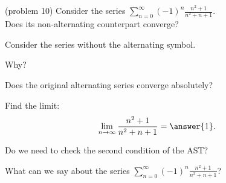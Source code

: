\documentclass{ximera}
\begin{document}
\begin{problem}(problem 10)
Consider the series $\displaystyle{\sum_{n=0}^\infty (-1)^n \frac{n^2 + 1}{n^2 + n + 1}}$.\\
Does its non-alternating counterpart converge?
\begin{hint} 
Consider the series without the alternating symbol.
\end{hint}
\begin{multipleChoice}
\end{multipleChoice}

Why?
\begin{multipleChoice}
\end{multipleChoice}




Does the original alternating series converge absolutely?
\begin{multipleChoice}
\end{multipleChoice}



Find the limit:
\[
\lim_{n\to\infty} \frac{n^2 + 1}{n^2 + n + 1} = \answer{1}.
\]

Do we need to check the second condition of the AST?
\begin{multipleChoice}
\end{multipleChoice}


What can we say about the series $\displaystyle{\sum_{n=0}^\infty (-1)^n \frac{n^2 + 1}{n^2 + n + 1}}$?
\begin{multipleChoice}
\end{multipleChoice}

\end{problem}
\end{document}
